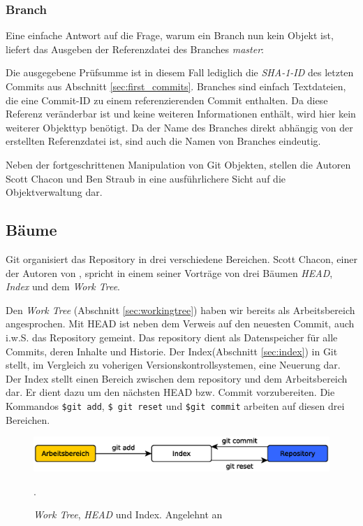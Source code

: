 \subsubsection{Branch}\label{sec:branchobject}
Eine einfache Antwort auf die Frage, warum ein Branch nun kein Objekt ist, liefert
das Ausgeben der Referenzdatei des Branches \textit{master}:


Die ausgegebene Prüfsumme ist in diesem Fall lediglich die \textit{SHA-1-ID} des
letzten Commits aus Abschnitt \ref{sec:first_commits}. Branches sind einfach
Textdateien, die eine Commit-ID zu einem referenzierenden Commit enthalten. Da
diese Referenz veränderbar ist und keine weiteren Informationen enthält, wird
hier kein weiterer Objekttyp benötigt. Da der Name des Branches direkt abhängig
von der erstellten Referenzdatei ist, sind auch die Namen von Branches
eindeutig.

Neben der fortgeschrittenen Manipulation von Git Objekten, stellen die Autoren
Scott Chacon und Ben Straub in \cite[S.~408-418]{progit} eine ausführlichere
Sicht auf die Objektverwaltung dar.

\subsection{Bäume}\label{sec:trees}
Git organisiert das Repository in drei verschiedene Bereichen. Scott Chacon,
einer der Autoren von \cite{progit}, spricht in einem seiner
Vorträge\cite{link:talesoftrees} von drei Bäumen \textit{HEAD}, \textit{Index}
und dem \textit{Work Tree}.

Den \textit{Work Tree} (Abschnitt \ref{sec:workingtree}) haben wir bereits als
Arbeitsbereich angesprochen. Mit \gls{HEAD} ist neben dem Verweis auf den
neuesten Commit, auch i.w.S. das Repository gemeint. Das \gls{repository} dient
als Datenspeicher für alle Commits, deren Inhalte und Historie. Der
Index(Abschnitt \ref{sec:index}) in Git stellt, im Vergleich zu voherigen
Versionskontrollsystemen, eine Neuerung dar. Der Index stellt einen Bereich
zwischen dem \gls{repository} und dem Arbeitsbereich dar. Er dient dazu um den
nächsten \gls{HEAD} bzw. Commit vorzubereiten. Die Kommandos \texttt{\$git
add}, \texttt{\$ git reset} und \texttt{\$git commit} arbeiten auf diesen drei
Bereichen.\cite[34-35]{gitosp}

\begin{figure}[h]
    \centering
    \includegraphics[scale=0.60]{images/trees.eps}
    \caption{\textit{Work Tree}, \textit{HEAD} und Index. Angelehnt an
    \cite[34]{gitosp}}.
    \label{fig:trees}
\end{figure}

